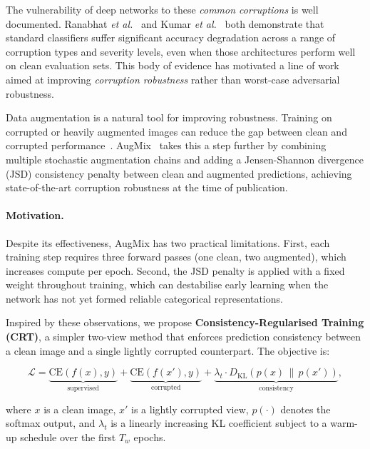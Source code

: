 \documentclass[10pt,twocolumn]{article}
\begin{document}
The vulnerability of deep networks to these \emph{common corruptions} is well documented. Ranabhat \emph{et al.}~\cite{ranabhat2025shapebias} and Kumar \emph{et al.}~\cite{kumar2026demhec} both demonstrate that standard classifiers suffer significant accuracy degradation across a range of corruption types and severity levels, even when those architectures perform well on clean evaluation sets. This body of evidence has motivated a line of work aimed at improving \emph{corruption robustness} rather than worst-case adversarial robustness.

Data augmentation is a natural tool for improving robustness. Training on corrupted or heavily augmented images can reduce the gap between clean and corrupted performance~\cite{erichson2024noisymix,kumar2026demhec}. AugMix~\cite{hendrycks2020augmix} takes this a step further by combining multiple stochastic augmentation chains and adding a Jensen-Shannon divergence (JSD) consistency penalty between clean and augmented predictions, achieving state-of-the-art corruption robustness at the time of publication.

\paragraph{Motivation.} Despite its effectiveness, AugMix has two practical limitations. First, each training step requires three forward passes (one clean, two augmented), which increases compute per epoch. Second, the JSD penalty is applied with a fixed weight throughout training, which can destabilise early learning when the network has not yet formed reliable categorical representations.

Inspired by these observations, we propose \textbf{Consistency-Regularised Training (CRT)}, a simpler two-view method that enforces prediction consistency between a clean image and a single lightly corrupted counterpart. The objective is:

\begin{equation}
\mathcal{L} = \underbrace{\mathrm{CE}(f(x), y)}_{\text{supervised}} + \underbrace{\mathrm{CE}(f(x'), y)}_{\text{corrupted}} + \underbrace{\lambda_t \cdot D_{\mathrm{KL}}\!\left(p(x) \,\|\, p(x')\right)}_{\text{consistency}},
\label{eq:loss}
\end{equation}

where $x$ is a clean image, $x'$ is a lightly corrupted view, $p(\cdot)$ denotes the softmax output, and $\lambda_t$ is a linearly increasing KL coefficient subject to a warm-up schedule over the first $T_w$ epochs.
\end{document}
